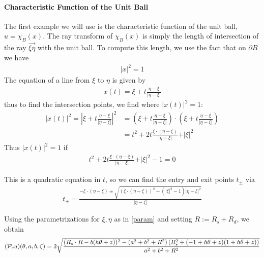 \documentclass[12pt]{article}
\begin{document}
\paragraph{Characteristic Function of the Unit Ball}
The first example we will use is the characteristic function of the unit ball, $u = \chi_{B}(x)$.  The ray transform of $\chi_B(x)$ is simply the length of intersection of the ray $\overrightarrow{\xi\eta}$ with the unit ball.  To compute this length, we use the fact that on $\partial B$ we have
\begin{align*}
\vert x\vert ^2 = 1
\end{align*}  The equation of a line from $\xi$ to $\eta$ is given by 
\begin{align*}
x(t) = \xi+t\frac{\eta-\xi}{\vert \eta-\xi\vert}
\end{align*}thus to find the intersection points, we find where $\vert x(t)\vert^2 = 1$: 
\begin{align*}
\vert x(t)\vert ^2 = \left\vert \xi+t\frac{\eta-\xi}{\vert \eta-\xi\vert}\right\vert ^2  &= \left(\xi+t\frac{\eta-\xi}{\vert \eta-\xi\vert}\right)\cdot \left(\xi+t\frac{\eta-\xi}{\vert \eta-\xi\vert}\right)\\
& = t^2 + 2t\frac{\xi\cdot(\eta-\xi)}{\vert \eta -\xi\vert} + \vert \xi\vert^2
\end{align*}Thus $\vert x(t)\vert^2 = 1$ if 
\begin{align*}
t^2 + 2t\frac{\xi\cdot(\eta-\xi)}{\vert \eta -\xi\vert} + \vert \xi\vert^2-1=0
\end{align*}

This is a quadratic equation in $t$, so we can find the entry and exit points $t_{\pm}$ via 
\begin{align*}
t_{\pm} = \frac{-\xi\cdot(\eta-\xi)\pm\sqrt{(\xi\cdot (\eta-\xi))^2-(\vert\xi\vert^2-1)\vert\eta-\xi\vert^2}}{\vert\eta-\xi\vert}
\end{align*}

Using the parametrizations for $\xi,\eta$ as in \eqref{param} and setting $R:=R_s+R_d$, we obtain 
\begin{align*}
(\P_cu)(\theta,a,b,\zeta) = 2\sqrt{\frac{(R_s \cdot R-b (h \theta+z))^2-\left(a^2+b^2+R^2\right) \left(R_s^2+(-1+h \theta+z) (1+h \theta+z)\right)}{a^2+b^2+R^2}}
\end{align*}
\end{document}
